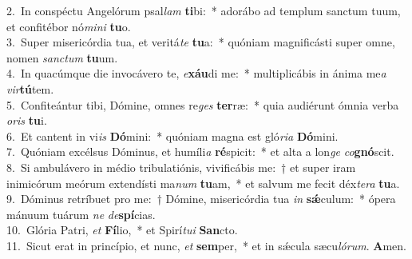 {2.~}In conspéctu Angelórum psal\textit{lam} \textbf{ti}bi:~* adorábo ad templum sanctum tuum, et confitébor nó\textit{mi}\textit{ni} \textbf{tu}o.\\
{3.~}Super misericórdia tua, et veritá\textit{te} \textbf{tu}a:~* quóniam magnificásti super omne, nomen \textit{san}\textit{ctum} \textbf{tu}um.\\
{4.~}In quacúmque die invocávero te, \textit{e}\textbf{xáu}di me:~* multiplicábis in ánima me\textit{a} \textit{vir}\textbf{tú}tem.\\
{5.~}Confiteántur tibi, Dómine, omnes re\textit{ges} \textbf{ter}ræ:~* quia audiérunt ómnia verba \textit{o}\textit{ris} \textbf{tu}i.\\
{6.~}Et cantent in vi\textit{is} \textbf{Dó}mini:~* quóniam magna est gló\textit{ri}\textit{a} \textbf{Dó}mini.\\
{7.~}Quóniam excélsus Dóminus, et humíli\textit{a} \textbf{ré}spicit:~* et alta a lon\textit{ge} \textit{co}\textbf{gnó}scit.\\
{8.~}Si ambulávero in médio tribulatiónis, vivificábis me:~† et super iram inimicórum meórum extendísti ma\textit{num} \textbf{tu}am,~* et salvum me fecit déx\textit{te}\textit{ra} \textbf{tu}a.\\
{9.~}Dóminus retríbuet pro me:~† Dómine, misericórdia tua \textit{in} \textbf{sǽ}culum:~* ópera mánuum tuárum \textit{ne} \textit{de}\textbf{spí}cias.\\
{10.~}Glória Patri, \textit{et} \textbf{Fí}lio,~* et Spirí\textit{tu}\textit{i} \textbf{San}cto.\\
{11.~}Sicut erat in princípio, et nunc, \textit{et} \textbf{sem}per,~* et in sǽcula sæcu\textit{ló}\textit{rum}. \textbf{A}men.\\
